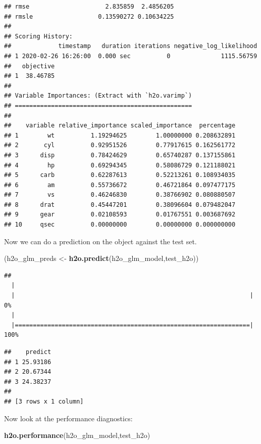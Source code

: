 \documentclass[]{book}
\newenvironment{Shaded}{\begin{snugshade}}{\end{snugshade}}
\newcommand{\KeywordTok}[1]{\textcolor[rgb]{0.13,0.29,0.53}{\textbf{#1}}}
\newcommand{\StringTok}[1]{\textcolor[rgb]{0.31,0.60,0.02}{#1}}
\newcommand{\NormalTok}[1]{#1}
\begin{document}
\begin{verbatim}
## rmse                     2.835859  2.4856205
## rmsle                  0.13590272 0.10634225
## 
## Scoring History: 
##             timestamp   duration iterations negative_log_likelihood
## 1 2020-02-26 16:26:00  0.000 sec          0              1115.56759
##   objective
## 1  38.46785
## 
## Variable Importances: (Extract with `h2o.varimp`) 
## =================================================
## 
##    variable relative_importance scaled_importance  percentage
## 1        wt          1.19294625        1.00000000 0.208632891
## 2       cyl          0.92951526        0.77917615 0.162561772
## 3      disp          0.78424629        0.65740287 0.137155861
## 4        hp          0.69294345        0.58086729 0.121188021
## 5      carb          0.62287613        0.52213261 0.108934035
## 6        am          0.55736672        0.46721864 0.097477175
## 7        vs          0.46246830        0.38766902 0.080880507
## 8      drat          0.45447201        0.38096604 0.079482047
## 9      gear          0.02108593        0.01767551 0.003687692
## 10     qsec          0.00000000        0.00000000 0.000000000
\end{verbatim}

Now we can do a prediction on the object against the test set.

\begin{Shaded}
\begin{Highlighting}[]
\NormalTok{(h2o_glm_preds <-}\StringTok{ }\KeywordTok{h2o.predict}\NormalTok{(h2o_glm_model,test_h2o))}
\end{Highlighting}
\end{Shaded}

\begin{verbatim}
## 
  |                                                                       
  |                                                                 |   0%
  |                                                                       
  |=================================================================| 100%
\end{verbatim}

\begin{verbatim}
##    predict
## 1 25.93186
## 2 20.67344
## 3 24.38237
## 
## [3 rows x 1 column]
\end{verbatim}

Now look at the performance diagnostics:

\begin{Shaded}
\begin{Highlighting}[]
\KeywordTok{h2o.performance}\NormalTok{(h2o_glm_model,test_h2o)}
\end{Highlighting}
\end{Shaded}
\end{document}
